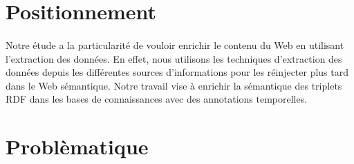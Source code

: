 \section{Positionnement}
\paragraph{}
Notre étude a la particularité de vouloir enrichir le contenu du Web en utilisant l'extraction des données. 
En effet, nous utilisons les techniques d'extraction des données depuis les différentes sources d'informations pour les réinjecter plus tard dans le Web sémantique. Notre travail vise à enrichir la sémantique des triplets RDF dans les bases de connaissances avec des annotations temporelles.
\section{Problèmatique}
